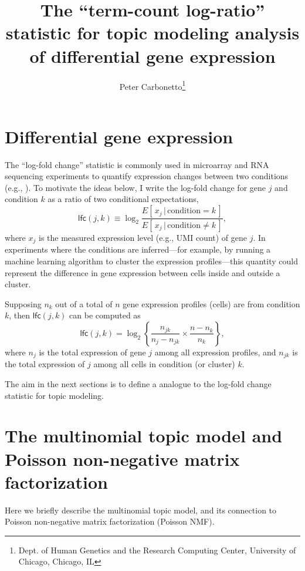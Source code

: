 \documentclass[final]{siamart171218}
\title{The ``term-count log-ratio'' statistic for topic modeling analysis
  of differential gene expression}
\author{Peter Carbonetto\thanks{Dept. of Human Genetics and the Research Computing Center, University of Chicago, Chicago, IL}}
\begin{document}
\maketitle

\section{Differential gene expression}

The ``log-fold change'' statistic is commonly used in microarray and
RNA sequencing experiments to quantify expression changes between two
conditions (e.g., \cite{cui-churchill-2003, quackenbush-2002}). To
motivate the ideas below, I write the log-fold change for gene $j$
and condition $k$ as a ratio of two conditional expectations,
\begin{equation}
\mathsf{lfc}(j,k) \equiv
\log_2 \frac{E[\,x_j \,|\, \mathrm{condition} = k\,]}
            {E[\,x_j \,|\, \mathrm{condition} \neq k\,]},
\end{equation}
where $x_j$ is the measured expression level (e.g., UMI count) of gene
$j$. In experiments where the conditions are inferred---for example,
by running a machine learning algorithm to cluster the expression
profiles---this quantity could represent the difference in gene
expression between cells inside and outside a cluster.

Supposing $n_k$ out of a total of $n$ gene expression profiles
(cells) are from condition $k$, then $\mathsf{lfc}(j,k)$ can be
computed as
\begin{equation}
\mathsf{lfc}(j,k) =
\log_2 \left\{\frac{n_{jk}}{n_j - n_{jk}} \times \frac{n - n_k}{n_k} \right\},
\end{equation}
where $n_j$ is the total expression of gene $j$ among all expression
profiles, and $n_{jk}$ is the total expression of $j$ among all cells
in condition (or cluster) $k$.

The aim in the next sections is to define a analogue to the log-fold
change statistic for topic modeling.

\section{The multinomial topic model and Poisson non-negative matrix
  factorization}

Here we briefly describe the multinomial topic model, and its
connection to Poisson non-negative matrix factorization (Poisson NMF).
\end{document}
